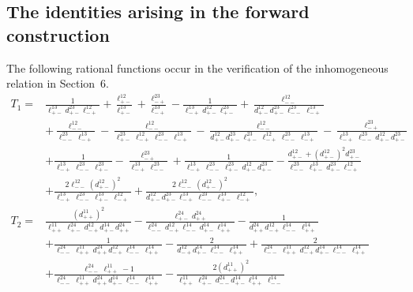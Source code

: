 \documentclass[a4,10pt]{amsart}
\numberwithin{equation}{section}
\theoremstyle{definition}
\begin{document}
\subsection{The identities arising in the forward construction}
The following rational functions occur in the verification of the inhomogeneous relation in Section~6. 
\begingroup
\small
\allowdisplaybreaks[4]
\begin{align*}
T_1
=&\frac{1}{\ell^{13}_{+-}d^{23}_{+-}\ell^{12}_{-+}}
+\frac{\ell^{12}_{+-}}{\ell^{13}_{+-}}
+\frac{\ell^{23}_{-+}}{\ell^{13}_{-+}}
-\frac{1}{\ell^{13}_{-+}d^{12}_{+-}\ell^{23}_{+-}}
+\frac{\ell^{12}_{--}}
{d^{12}_{+-}d^{23}_{+-}\ell^{23}_{--}\ell^{13}_{-+}}\\
&+\frac{\ell^{12}_{--}}
{\ell^{23}_{--}\ell^{13}_{-+}}
-\frac{\ell^{12}_{--}}
{\ell^{23}_{+-}\ell^{12}_{-+}\ell^{23}_{--}\ell^{13}_{-+}}
-\frac{\ell^{12}_{--}}
{d^{12}_{+-}d^{23}_{+-}\ell^{23}_{+-}\ell^{12}_{-+}
\ell^{23}_{--}\ell^{13}_{-+}}
-\frac{\ell^{23}_{-+}}
{\ell^{13}_{-+}\ell^{23}_{--}d^{12}_{+-}d^{23}_{+-}}\\
& +\frac{1}{\ell^{13}_{-+}\ell^{23}_{--}\ell^{23}_{+-}}
-\frac{\ell^{23}_{-+}}
{\ell^{13}_{-+}\ell^{23}_{--}}
+\frac{1}
{\ell^{13}_{-+}\ell^{23}_{--}\ell^{23}_{+-}d^{12}_{+-}d^{23}_{+-}}
-\frac{d^{12}_{+-}+(d^{12}_{+-})^2d^{23}_{+-}}
{\ell^{23}_{--}\ell^{13}_{+-}d^{23}_{+-}\ell^{12}_{-+}}\\
&+\frac{2\ell^{12}_{--}(d^{12}_{+-})^2}
{\ell^{13}_{-+}\ell^{23}_{--}\ell^{13}_{+-}\ell^{12}_{-+}}
+\frac{2\ell^{12}_{--}(d^{12}_{+-})^2}
{d^{12}_{+-}d^{23}_{+-}\ell^{13}_{-+}\ell^{23}_{--}
\ell^{13}_{+-}\ell^{12}_{-+}},
\\[2mm]
T_2
=&\frac{(d^{11}_{++})^2}
{\ell^{11}_{++}\ell^{24}_{+-}d^{12}_{-+}d^{14}_{+-}d^{24}_{++}}
-\frac{\ell^{24}_{+-}d^{24}_{++}}
{\ell^{24}_{--}d^{12}_{-+}\ell^{14}_{--}d^{14}_{+-}\ell^{14}_{++}}
-\frac{1}
{d^{24}_{++}d^{12}_{-+}\ell^{14}_{--}\ell^{14}_{++}}\\
&+\frac{1}
{\ell^{24}_{--}\ell^{11}_{++}d^{24}_{++}d^{12}_{-+}
\ell^{14}_{--}\ell^{14}_{++}}
-\frac{2}
{d^{12}_{-+}d^{14}_{+-}\ell^{14}_{--}\ell^{14}_{++}}
+\frac{2}
{\ell^{24}_{--}\ell^{11}_{++}d^{12}_{-+}d^{14}_{+-}
\ell^{14}_{--}\ell^{14}_{++}}\\
&+\frac{\ell^{24}_{--}\ell^{11}_{++}-1}
{\ell^{24}_{--}\ell^{11}_{++}d^{24}_{++}d^{14}_{+-}
\ell^{14}_{--}\ell^{14}_{++}}
-\frac{2(d^{11}_{++})^2}
{\ell^{11}_{++}\ell^{24}_{+-}d^{24}_{--}d^{14}_{+-}
\ell^{14}_{++}\ell^{14}_{--}}\\

\end{align*}
\end{document}
